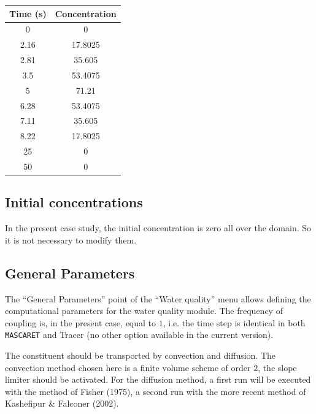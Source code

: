 \documentclass[a4paper,12pt]{article}
\begin{document}
\begin{table}[h]
 
\begin{center}

\begin{tabular}{|c|c|}
\hline 
Time (s) & Concentration\tabularnewline
\hline 
\hline 
0 & 0\tabularnewline
\hline 
2.16 & 17.8025\tabularnewline
\hline 
2.81 & 35.605\tabularnewline
\hline 
3.5 & 53.4075\tabularnewline
\hline 
5 & 71.21\tabularnewline
\hline 
6.28 & 53.4075\tabularnewline
\hline 
7.11 & 35.605\tabularnewline
\hline 
8.22 & 17.8025\tabularnewline
\hline 
25 & 0\tabularnewline
\hline 
50 & 0\tabularnewline
\hline 
\end{tabular}

\end{center}

\end{table}

\subsection{Initial concentrations }

\hspace{0.5cm}In the present case study, the initial concentration is zero all over
the domain. So it is not necessary to modify them.


\subsection{General Parameters  }

\hspace{0.5cm}The {}``General Parameters'' point of the {}``Water quality''
menu allows defining the computational parameters for the water
quality module. The frequency of coupling is, in the present case,
equal to $1$, i.e. the time step is identical in both \texttt{MASCARET} and Tracer
(no other option available in the current version). 

\vspace{0.5cm}

\hspace{0.5cm}The constituent should be transported by convection and diffusion.
The convection method chosen here is a finite volume scheme of order
$2$, the slope limiter should be activated. For the diffusion method,
a first run will be executed with the method of Fisher (1975), a second
run with the more recent method of Kashefipur \& Falconer (2002).
\end{document}
